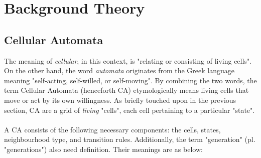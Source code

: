 \chapter{Background Theory}

\section{Cellular Automata}
The meaning of \textit{cellular}, in this context, is "relating or consisting of living cells". On the other hand, the word \textit{automata} originates from the Greek language meaning "self-acting, self-willed, or self-moving". By combining the two words, the term Cellular Automata (henceforth CA) etymologically means living cells that move or act by its own willingness. As briefly touched upon in the previous section, CA are a grid of \textit{living} "cells", each cell pertaining to a particular "state". 
\\ \\
A CA consists of the following necessary components: the cells, states, neighbourhood type, and transition rules. Additionally, the term "generation" (pl. "generations") also need definition. Their meanings are as below:
